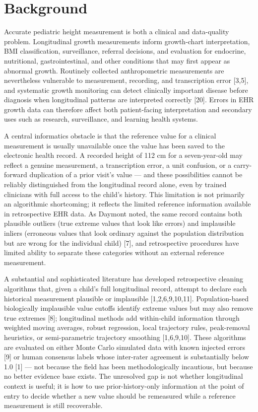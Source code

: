\documentclass[11pt]{article}
\begin{document}
\section{Background}\label{background}

Accurate pediatric height measurement is both a clinical and data-quality problem. Longitudinal growth measurements inform growth-chart interpretation, BMI classification, surveillance, referral decisions, and evaluation for endocrine, nutritional, gastrointestinal, and other conditions that may first appear as abnormal growth. Routinely collected anthropometric measurements are nevertheless vulnerable to measurement, recording, and transcription error [3,5], and systematic growth monitoring can detect clinically important disease before diagnosis when longitudinal patterns are interpreted correctly [20]. Errors in EHR growth data can therefore affect both patient-facing interpretation and secondary uses such as research, surveillance, and learning health systems.

A central informatics obstacle is that the reference value for a clinical measurement is usually unavailable once the value has been saved to the electronic health record. A recorded height of 112 cm for a seven-year-old may reflect a genuine measurement, a transcription error, a unit confusion, or a carry-forward duplication of a prior visit's value --- and these possibilities cannot be reliably distinguished from the longitudinal record alone, even by trained clinicians with full access to the child's history. This limitation is not primarily an algorithmic shortcoming; it reflects the limited reference information available in retrospective EHR data. As Daymont noted, the same record contains both plausible outliers (true extreme values that look like errors) and implausible inliers (erroneous values that look ordinary against the population distribution but are wrong for the individual child) [7], and retrospective procedures have limited ability to separate these categories without an external reference measurement.

A substantial and sophisticated literature has developed retrospective cleaning algorithms that, given a child's full longitudinal record, attempt to declare each historical measurement plausible or implausible [1,2,6,9,10,11]. Population-based biologically implausible value cutoffs identify extreme values but may also remove true extremes [8]; longitudinal methods add within-child information through weighted moving averages, robust regression, local trajectory rules, peak-removal heuristics, or semi-parametric trajectory smoothing [1,6,9,10]. These algorithms are evaluated on either Monte Carlo simulated data with known injected errors [9] or human consensus labels whose inter-rater agreement is substantially below 1.0 [1] --- not because the field has been methodologically incautious, but because no better evidence base exists. The unresolved gap is not whether longitudinal context is useful; it is how to use prior-history-only information at the point of entry to decide whether a new value should be remeasured while a reference measurement is still recoverable.
\end{document}
